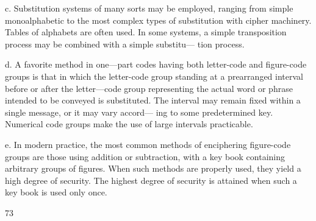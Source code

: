 c. Substitution systems of many sorts may be employed, ranging from
simple monoalphabetic to the most complex types of substitution with
cipher machinery. Tables of alphabets are often used. In some systems,
a simple transposition process may be combined with a simple substitu—
tion process.

d. A favorite method in one—part codes having both letter-code and
ﬁgure-code groups is that in which the letter-code group standing at a
prearranged interval before or after the letter—code group representing
the actual word or phrase intended to be conveyed is substituted. The
interval may remain ﬁxed within a single message, or it may vary accord—
ing to some predetermined key. Numerical code groups make the use of
large intervals practicable.

e. In modern practice, the most common methods of enciphering
ﬁgure-code groups are those using addition or subtraction, with a key
book containing arbitrary groups of ﬁgures. When such methods are
properly used, they yield a high degree of security. The highest degree
of security is attained when such a key book is used only once.

73

